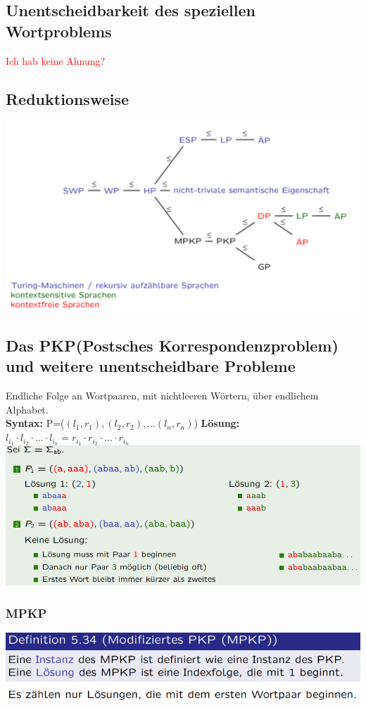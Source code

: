 \documentclass[12pt,a4paper]{article}
\begin{document}
	\subsection{Unentscheidbarkeit des speziellen Wortproblems}
	\textcolor{red}{Ich hab keine Ahnung?}

	\subsection{Reduktionsweise}
	\includegraphics[scale=0.4]{Bilder/Zusammenfassung_Unentscheidbarkeiten.png}

	\subsection{Das PKP(Postsches Korrespondenzproblem) und weitere unentscheidbare Probleme}
	Endliche Folge an Wortpaaren, mit nichtleeren Wörtern, über endlichem Alphabet.\\
	\textbf{Syntax:} P=($(l_1, r_1), (l_2, r_2), ...(l_n, r_n)$) \hfill \textbf{Lösung:} $l_{i_1} \cdot l_{i_2} \cdot ... \cdot l_{i_n} = r_{i_1} \cdot r_{i_2} \cdot ... \cdot r_{i_n}$\\
	\includegraphics[width=\textwidth]{Bilder/pkp.PNG}

	\subsubsection{MPKP}
	\includegraphics[width=\textwidth]{Bilder/mpkp.PNG}
\end{document}
